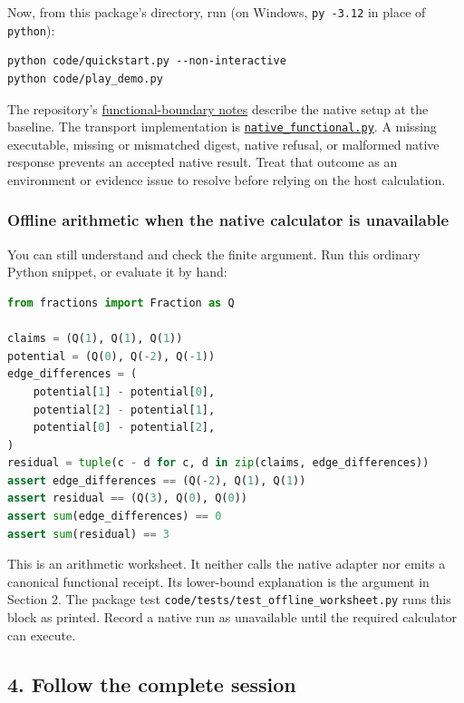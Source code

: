 \documentclass[
  11pt,
]{article}
\newcommand{\passthrough}[1]{#1}
\begin{document}
Now, from this package's directory, run (on Windows,
\passthrough{\lstinline!py -3.12!} in place of
\passthrough{\lstinline!python!}):

\begin{lstlisting}
python code/quickstart.py --non-interactive
python code/play_demo.py
\end{lstlisting}

The repository's
\href{https://github.com/dbccpage/the_symbol_game/blob/52cb5457f6c485ba548cfd292f6012a941ed22cf/education/FUNCTIONAL_BOUNDARY.md}{functional-boundary
notes} describe the native setup at the baseline. The transport
implementation is
\href{code/native_functional.py}{\nolinkurl{native_functional.py}}. A
missing executable, missing or mismatched digest, native refusal, or
malformed native response prevents an accepted native result. Treat that
outcome as an environment or evidence issue to resolve before relying on
the host calculation.

\subsubsection{Offline arithmetic when the native calculator is
unavailable}\label{offline-arithmetic-when-the-native-calculator-is-unavailable}

You can still understand and check the finite argument. Run this
ordinary Python snippet, or evaluate it by hand:

\begin{lstlisting}[language=Python]
from fractions import Fraction as Q

claims = (Q(1), Q(1), Q(1))
potential = (Q(0), Q(-2), Q(-1))
edge_differences = (
    potential[1] - potential[0],
    potential[2] - potential[1],
    potential[0] - potential[2],
)
residual = tuple(c - d for c, d in zip(claims, edge_differences))
assert edge_differences == (Q(-2), Q(1), Q(1))
assert residual == (Q(3), Q(0), Q(0))
assert sum(edge_differences) == 0
assert sum(residual) == 3
\end{lstlisting}

This is an arithmetic worksheet. It neither calls the native adapter nor
emits a canonical functional receipt. Its lower-bound explanation is the
argument in Section 2. The package test
\nolinkurl{code/tests/test_offline_worksheet.py} runs this block as
printed. Record a native run as unavailable until the required
calculator can execute.

\subsection{4. Follow the complete
session}\label{follow-the-complete-session}
\end{document}
